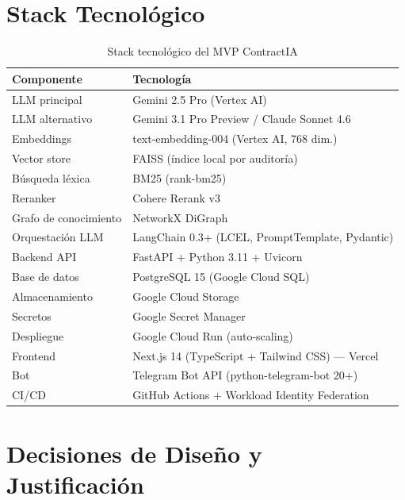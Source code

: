 \section{Stack Tecnológico}

\begin{table}[H]
\centering
\caption{Stack tecnológico del MVP ContractIA}
\label{tab:stack}
\begin{tabular}{p{4cm} p{9.5cm}}
\toprule
\textbf{Componente} & \textbf{Tecnología} \\
\midrule
LLM principal       & Gemini 2.5 Pro (Vertex AI) \\
LLM alternativo     & Gemini 3.1 Pro Preview / Claude Sonnet 4.6 \\
Embeddings          & text-embedding-004 (Vertex AI, 768 dim.) \\
Vector store        & FAISS (índice local por auditoría) \\
Búsqueda léxica     & BM25 (rank-bm25) \\
Reranker            & Cohere Rerank v3 \\
Grafo de conocimiento & NetworkX DiGraph \\
Orquestación LLM    & LangChain 0.3+ (LCEL, PromptTemplate, Pydantic) \\
Backend API         & FastAPI + Python 3.11 + Uvicorn \\
Base de datos       & PostgreSQL 15 (Google Cloud SQL) \\
Almacenamiento      & Google Cloud Storage \\
Secretos            & Google Secret Manager \\
Despliegue          & Google Cloud Run (auto-scaling) \\
Frontend            & Next.js 14 (TypeScript + Tailwind CSS) — Vercel \\
Bot                 & Telegram Bot API (python-telegram-bot 20+) \\
CI/CD               & GitHub Actions + Workload Identity Federation \\
\bottomrule
\end{tabular}
\end{table}

\section{Decisiones de Diseño y Justificación}

